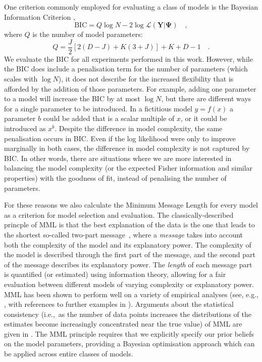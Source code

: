 \documentclass[twocolumn]{aastex62}
\newcommand{\vect}[1]{\boldsymbol{\mathbf{#1}}}
\renewcommand{\vec}[1]{\vect{#1}}
\newcommand{\data}{\textbf{Y}}
\newcommand{\NumDimensions}{D}
\newcommand{\NumLatentFactors}{J}
\newcommand{\NumComponents}{K}
\begin{document}
One criterion commonly employed for evaluating a class of models is the 
Bayesian Information Criterion \citep[BIC;][]{Schwarz:1978}, 
\begin{equation}
	\textrm{BIC} = Q\log{N} - 2\log\mathcal{L}\left(\data|\vec\Psi\right) \quad , \label{eq:bic}
\end{equation} 
\noindent{}where $Q$ is the number of model parameters:
\begin{equation}
	Q = \frac{\NumLatentFactors}{2}\left[2\left(\NumDimensions - \NumLatentFactors\right) + \NumComponents\left(3 + \NumLatentFactors\right)\right] + \NumComponents + \NumDimensions - 1 \quad .
\end{equation}
\noindent{}We evaluate the BIC for all experiments performed in this work.
However, while the BIC does include a penalisation term for the number of
parameters (which scales with $\log{N}$), it does not describe for the
increased flexibility that is afforded by the addition of those parameters.
For example, adding one parameter
to a model will increase the BIC by at most $\log{N}$, but there are different
ways for a single parameter to be introduced. In a fictitious model $y=f(x)$
a parameter $b$ could be added that is a scalar multiple of $x$, or it could be
introduced as $x^b$. Despite the difference in model complexity, the same
penalisation occurs in BIC. Even if the log likelihood were only to improve
marginally in both cases, the difference in model complexity is not captured
by BIC. In other words, there are situations where we are more interested in
balancing the model complexity (or the expected Fisher information and similar
properties) with the goodness of fit, instead of penalising the number of 
parameters.


For these reasons we also calculate the Minimum Message Length \citep[MML;][]{Wallace:2005}
for every model as a criterion for model selection and evaluation. 
The classically-described princple of MML is that the best explanation of the
data is the one that leads to the shortest so-called two-part message~\citep{Wallace:2005}, 
where a \textit{message} takes into account both the complexity of the model 
and its explanatory power. The complexity of the model is described through
the first part of the message, and the second part of the message describes
its explanatory power. The \emph{length} of each message part is quantified
(or estimated) using information theory, allowing for a fair evaluation between
different models of varying complexity or explanatory power. MML has been 
shown to perform well on a variety of empirical analyses (see, e.g., 
\cite{viswanathan1999finding,fitzgibbon2004minimum}, with references to 
further examples in \cite{Wallace:2005,dowe2007bayes,Dowe2008a,Dowe2011a}).
Arguments about the statistical consistency (i.e.,~as the number of data 
points increases the distributions of the estimates become increasingly 
concentrated near the true value) of MML are given in \cite{DoweWallace1997a,Dowe2011a}.
The MML principle requires that we explicitly specify our prior beliefs on the
model parameters, providing a Bayesian optimisation approach which can be
applied across entire classes of models.
\end{document}

